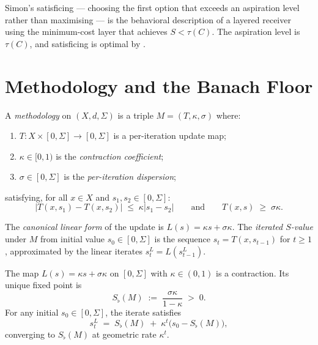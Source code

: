 \documentclass[twocolumn,11pt,a4paper]{article}
\newcommand{\Sfloor}{S_{\flat}}
\newcommand{\abs}[1]{\lvert#1\rvert}
\begin{document}
\begin{remark}[Satisficing]
\label{rem:satisficing}
Simon's satisficing \cite{simon1956} — choosing the first option that
exceeds an aspiration level rather than maximising — is the behavioral
description of a layered receiver using the minimum-cost layer that
achieves $S<\tau(C)$.  The aspiration level is $\tau(C)$, and
satisficing is optimal by .
\end{remark}

\section{Methodology and the Banach Floor}
\label{sec:methodology}

\begin{definition}[Methodology]
\label{def:methodology}
A \emph{methodology} on $(X,d,\Sigma)$ is a triple $M=(T,\kappa,\sigma)$
where:
\begin{enumerate}[label=(\alph*),leftmargin=*]
  \item $T\colon X\times[0,\Sigma]\to[0,\Sigma]$ is a per-iteration
    update map;
  \item $\kappa\in[0,1)$ is the \emph{contraction coefficient};
  \item $\sigma\in[0,\Sigma]$ is the \emph{per-iteration dispersion};
\end{enumerate}
satisfying, for all $x\in X$ and $s_1,s_2\in[0,\Sigma]$:
\[
  \abs{T(x,s_1)-T(x,s_2)}\;\leq\;\kappa\abs{s_1-s_2}
  \qquad\text{and}\qquad
  T(x,s)\;\geq\;\sigma\kappa.
\]
\end{definition}

\begin{definition}
\label{def:methodologyiter}
The \emph{canonical linear form} of the update is $L(s)=\kappa s+\sigma\kappa$.
The \emph{iterated $S$-value} under $M$ from initial value $s_0\in[0,\Sigma]$
is the sequence $s_t=T(x,s_{t-1})$ for $t\geq 1$, approximated by the
linear iterates $s_t^L=L(s_{t-1}^L)$.
\end{definition}

\begin{theorem}
\label{thm:banach}
The map $L(s)=\kappa s+\sigma\kappa$ on $[0,\Sigma]$ with $\kappa\in(0,1)$
is a contraction.  Its unique fixed point is
\[
  \Sfloor(M)\;:=\;\frac{\sigma\kappa}{1-\kappa}\;>\;0.
\]
For any initial $s_0\in[0,\Sigma]$, the iterate satisfies
\[
  s_t^L\;=\;\Sfloor(M)\;+\;\kappa^t\bigl(s_0-\Sfloor(M)\bigr),
\]
converging to $\Sfloor(M)$ at geometric rate $\kappa^t$.
\end{theorem}
\end{document}
